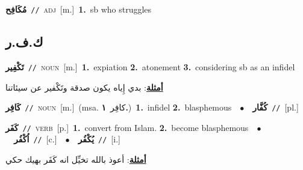 \documentclass[10pt,a4paper,twoside]{article} %
\begin{document}
\begin{multicols}{2}
{\setlength\topsep{0pt}\textbf{\foreignlanguage{arabic}{مُكَافِح}}\ {\color{gray}\texttt{//}\color{black}}\ \textsc{adj}\ [m.]\ \textbf{1.}~sb who struggles\ } \vspace{2mm}

\vspace{-3mm}
\subsection*{\color{blue}\foreignlanguage{arabic}{ك.ف.ر}\color{blue}{}} 

{\setlength\topsep{0pt}\textbf{\foreignlanguage{arabic}{تَكْفِير}}\ {\color{gray}\texttt{//}\color{black}}\ \textsc{noun}\ [m.]\ \textbf{1.}~expiation  \textbf{2.}~atonement  \textbf{3.}~considering sb as an infidel\  \begin{flushright}\color{gray}\foreignlanguage{arabic}{\textbf{\underline{\foreignlanguage{arabic}{أمثلة}}}: بدي إِياه يكون صدقة وتَكْفير عن سيئاتنا}\end{flushright}\color{black}} \vspace{2mm}

{\setlength\topsep{0pt}\textbf{\foreignlanguage{arabic}{كَافِر}}\ {\color{gray}\texttt{//}\color{black}}\ \textsc{noun}\ [m.]\ \color{gray}(msa. \foreignlanguage{arabic}{كافِر}~\foreignlanguage{arabic}{\textbf{١.}})\color{black}\ \textbf{1.}~infidel  \textbf{2.}~blasphemous\ \ $\bullet$\ \ \setlength\topsep{0pt}\textbf{\foreignlanguage{arabic}{كُفَّار}}\ {\color{gray}\texttt{//}\color{black}}\ [pl.]\ } \vspace{2mm}

{\setlength\topsep{0pt}\textbf{\foreignlanguage{arabic}{كَفَر}}\ {\color{gray}\texttt{//}\color{black}}\ \textsc{verb}\ [p.]\ \textbf{1.}~convert from Islam.  \textbf{2.}~become blasphemous\ \ $\bullet$\ \ \setlength\topsep{0pt}\textbf{\foreignlanguage{arabic}{اُكْفُر}}\ {\color{gray}\texttt{//}\color{black}}\ [c.]\ \ $\bullet$\ \ \setlength\topsep{0pt}\textbf{\foreignlanguage{arabic}{يُكْفُر}}\ {\color{gray}\texttt{//}\color{black}}\ [i.]\  \begin{flushright}\color{gray}\foreignlanguage{arabic}{\textbf{\underline{\foreignlanguage{arabic}{أمثلة}}}: أعوذ بالله تخيِّل انه كَفَر بهيك حكي}\end{flushright}\color{black}} \vspace{2mm}


\end{multicols}
\end{document}
